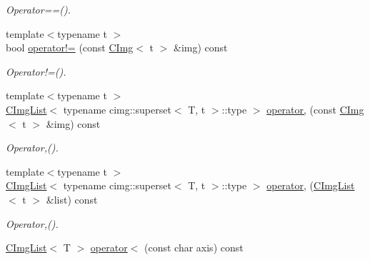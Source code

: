 \begin{DoxyCompactItemize}
\begin{DoxyCompactList}\small\item\em Operator==(). \item\end{DoxyCompactList}\item 
\hypertarget{structcimg__library_1_1CImg_a826e9d8fbbc121776b306f8c2ad13e22}{
{\footnotesize template$<$typename t $>$ }\\bool \hyperlink{structcimg__library_1_1CImg_a826e9d8fbbc121776b306f8c2ad13e22}{operator!=} (const \hyperlink{structcimg__library_1_1CImg}{CImg}$<$ t $>$ \&img) const }
\label{structcimg__library_1_1CImg_a826e9d8fbbc121776b306f8c2ad13e22}

\begin{DoxyCompactList}\small\item\em Operator!=(). \item\end{DoxyCompactList}\item 
\hypertarget{structcimg__library_1_1CImg_a5e4e79e2179d645fdaa54973c277caf9}{
{\footnotesize template$<$typename t $>$ }\\\hyperlink{structcimg__library_1_1CImgList}{CImgList}$<$ typename cimg::superset$<$ T, t $>$::type $>$ \hyperlink{structcimg__library_1_1CImg_a5e4e79e2179d645fdaa54973c277caf9}{operator,} (const \hyperlink{structcimg__library_1_1CImg}{CImg}$<$ t $>$ \&img) const }
\label{structcimg__library_1_1CImg_a5e4e79e2179d645fdaa54973c277caf9}

\begin{DoxyCompactList}\small\item\em Operator,(). \item\end{DoxyCompactList}\item 
\hypertarget{structcimg__library_1_1CImg_af03ea6f694f4e61d67869f8482f87a76}{
{\footnotesize template$<$typename t $>$ }\\\hyperlink{structcimg__library_1_1CImgList}{CImgList}$<$ typename cimg::superset$<$ T, t $>$::type $>$ \hyperlink{structcimg__library_1_1CImg_af03ea6f694f4e61d67869f8482f87a76}{operator,} (\hyperlink{structcimg__library_1_1CImgList}{CImgList}$<$ t $>$ \&list) const }
\label{structcimg__library_1_1CImg_af03ea6f694f4e61d67869f8482f87a76}

\begin{DoxyCompactList}\small\item\em Operator,(). \item\end{DoxyCompactList}\item 
\hypertarget{structcimg__library_1_1CImg_afe3488dac908a062ddbd0b53a11be712}{
\hyperlink{structcimg__library_1_1CImgList}{CImgList}$<$ T $>$ \hyperlink{structcimg__library_1_1CImg_afe3488dac908a062ddbd0b53a11be712}{operator$<$} (const char axis) const }
\label{structcimg__library_1_1CImg_afe3488dac908a062ddbd0b53a11be712}


\end{DoxyCompactItemize}
